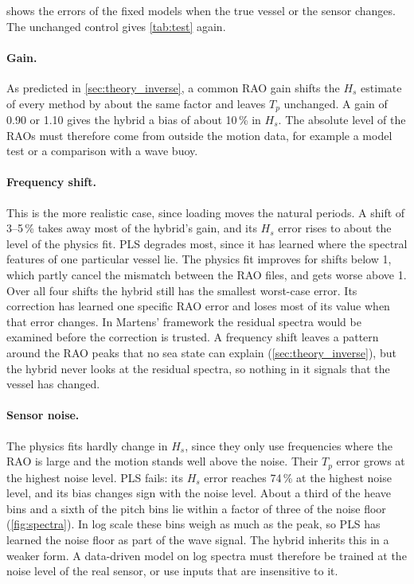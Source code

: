 \documentclass[10pt,a4paper,twocolumn,twoside]{article}
\newcommand{\Hs}{H_{s}}
\newcommand{\Tp}{T_{p}}
\newcommand{\pct}[1]{#1\,\%}
\begin{document}
 shows the errors of the fixed models when the true vessel or the sensor changes.
The unchanged control gives \cref{tab:test} again.

\paragraph{Gain.}
As predicted in \cref{sec:theory_inverse}, a common RAO gain shifts the $\Hs$ estimate of every
method by about the same factor and leaves $\Tp$ unchanged. A gain of 0.90 or 1.10 gives the hybrid
a bias of about 10\,\% in $\Hs$. The absolute level of the RAOs must therefore come from outside the
motion data, for example a model test or a comparison with a wave buoy.

\paragraph{Frequency shift.}
This is the more realistic case, since loading moves the natural periods. A shift of 3--5\,\% takes
away most of the hybrid's gain, and its $\Hs$ error rises to about the level of the physics fit.
PLS degrades most, since it has learned where the spectral features of one particular vessel lie.
The physics fit improves for shifts below 1, which partly cancel the mismatch between the RAO
files, and gets worse above 1. Over all four shifts the hybrid still has the smallest worst-case
error. Its correction has learned one specific RAO error and loses most of its value when that
error changes. In Martens' framework the residual spectra would be examined before the correction
is trusted. A frequency shift leaves a pattern around the RAO peaks that no sea state can explain
(\cref{sec:theory_inverse}), but the hybrid never looks at the residual spectra, so nothing in it
signals that the vessel has changed.

\paragraph{Sensor noise.}
The physics fits hardly change in $\Hs$, since they only use frequencies where the RAO is large and
the motion stands well above the noise. Their $\Tp$ error grows at the highest noise level. PLS
fails: its $\Hs$ error reaches \pct{74} at the highest noise level, and its bias changes sign with
the noise level. About a third of the heave bins and a sixth of the pitch bins lie within a factor
of three of the noise floor (\cref{fig:spectra}). In log scale these bins weigh as much as the
peak, so PLS has learned the noise floor as part of the wave signal. The hybrid inherits this in a
weaker form. A data-driven model on log spectra must therefore be trained at the noise level of
the real sensor, or use inputs that are insensitive to it.
\end{document}
